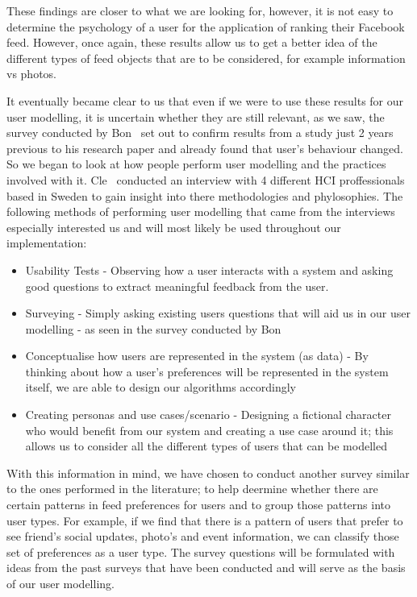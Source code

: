 These findings are closer to what we are looking for, however, it is not easy to determine the psychology of a user for the application of ranking their Facebook feed. However, once again, these results allow us to get a better idea of the different types of feed objects that are to be considered, for example information vs photos. 

It eventually became clear to us that even if we were to use these results for our user modelling, it is uncertain whether they are still relevant, as we saw, the survey conducted by Bon~\cite{bonds2010myspace} set out to confirm results from a study just 2 years previous to his research paper and already found that user's behaviour changed. So we began to look at how people perform user modelling and the practices involved with it. Cle~\cite{clemmensen2004four} conducted an interview with 4 different HCI proffessionals based in Sweden to gain insight into there methodologies and phylosophies. The following methods of performing user modelling that came from the interviews especially interested us and will most likely be used throughout our implementation:

\begin{itemize}
 \item Usability Tests - Observing how a user interacts with a system and asking good questions to extract meaningful feedback from the user.
 \item Surveying - Simply asking existing users questions that will aid us in our user modelling - as seen in the survey conducted by Bon~\cite{bonds2010myspace}
 \item Conceptualise how users are represented in the system (as data) - By thinking about how a user's preferences will be represented in the system itself, we are able to design our algorithms accordingly
 \item Creating personas and use cases/scenario - Designing a fictional character who would benefit from our system and creating a use case around it; this allows us to consider all the different types of users that can be modelled
\end{itemize}

With this information in mind, we have chosen to conduct another survey similar to the ones performed in the literature; to help deermine whether there are certain patterns in feed preferences for users and to group those patterns into user types. For example, if we find that there is a pattern of users that prefer to see friend's social updates, photo's and event information, we can classify those set of preferences as a user type. The survey questions will be formulated with ideas from the past surveys that have been conducted and will serve as the basis of our user modelling.

